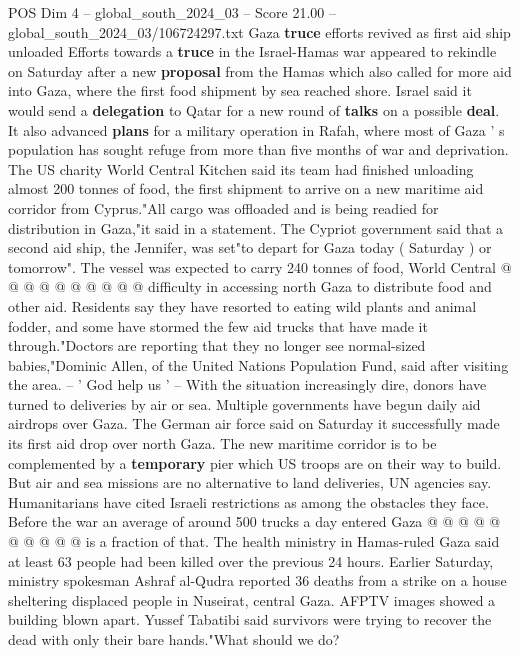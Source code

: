 \begin{textsample}{POS Dim 4 – global\_south\_2024\_03 – Score 21.00 – global\_south\_2024\_03/106724297.txt}  \label{ex:f4_pos_103}
Gaza \textbf{truce} efforts revived as first aid ship unloaded Efforts towards a \textbf{truce} in the Israel-Hamas war appeared to rekindle on Saturday after a new \textbf{proposal} from the Hamas which also called for more aid into Gaza, where the first food shipment by sea reached shore.
Israel said it would send a \textbf{delegation} to Qatar for a new round of \textbf{talks} on a possible \textbf{deal}.
It also advanced \textbf{plans} for a military operation in Rafah, where most of Gaza ' s population has sought refuge from more than five months of war and deprivation.
The US charity World Central Kitchen said its team had finished unloading almost 200 tonnes of food, the first shipment to arrive on a new maritime aid corridor from Cyprus."All cargo was offloaded and is being readied for distribution in Gaza,"it said in a statement.
The Cypriot government said that a second aid ship, the Jennifer, was set"to depart for Gaza today ( Saturday ) or tomorrow".
The vessel was expected to carry 240 tonnes of food, World Central @ @ @ @ @ @ @ @ @ @ difficulty in accessing north Gaza to distribute food and other aid.
Residents say they have resorted to eating wild plants and animal fodder, and some have stormed the few aid trucks that have made it through."Doctors are reporting that they no longer see normal-sized babies,"Dominic Allen, of the United Nations Population Fund, said after visiting the area. -- ' God help us ' -- With the situation increasingly dire, donors have turned to deliveries by air or sea.
Multiple governments have begun daily aid airdrops over Gaza.
The German air force said on Saturday it successfully made its first aid drop over north Gaza.
The new maritime corridor is to be complemented by a \textbf{temporary} pier which US troops are on their way to build.
But air and sea missions are no alternative to land deliveries, UN agencies say.
Humanitarians have cited Israeli restrictions as among the obstacles they face.
Before the war an average of around 500 trucks a day entered Gaza @ @ @ @ @ @ @ @ @ @ is a fraction of that.
The health ministry in Hamas-ruled Gaza said at least 63 people had been killed over the previous 24 hours.
Earlier Saturday, ministry spokesman Ashraf al-Qudra reported 36 deaths from a strike on a house sheltering displaced people in Nuseirat, central Gaza.
AFPTV images showed a building blown apart.
Yussef Tabatibi said survivors were trying to recover the dead with only their bare hands."What should we do?

\end{textsample}
